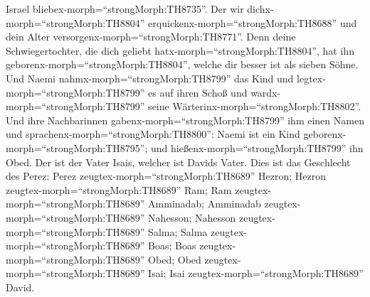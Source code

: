 Israel bliebex-morph=``strongMorph:TH8735''.  Der wir
dichx-morph=``strongMorph:TH8804''
erquickenx-morph=``strongMorph:TH8688'' und dein Alter
versorgenx-morph=``strongMorph:TH8771''. Denn deine Schwiegertochter,
die dich geliebt hatx-morph=``strongMorph:TH8804'', hat ihn
geborenx-morph=``strongMorph:TH8804'', welche dir besser ist als sieben
Söhne.  Und Naemi nahmx-morph=``strongMorph:TH8799'' das
Kind und legtex-morph=``strongMorph:TH8799'' es auf ihren Schoß und
wardx-morph=``strongMorph:TH8799'' seine
Wärterinx-morph=``strongMorph:TH8802''.  Und ihre
Nachbarinnen gabenx-morph=``strongMorph:TH8799'' ihm einen Namen und
sprachenx-morph=``strongMorph:TH8800'': Naemi ist ein Kind
geborenx-morph=``strongMorph:TH8795''; und
hießenx-morph=``strongMorph:TH8799'' ihn Obed. Der ist der Vater Isais,
welcher ist Davids Vater.  Dies ist das Geschlecht des
Perez: Perez zeugtex-morph=``strongMorph:TH8689'' Hezron; 
Hezron zeugtex-morph=``strongMorph:TH8689'' Ram; Ram
zeugtex-morph=``strongMorph:TH8689'' Amminadab;  Amminadab
zeugtex-morph=``strongMorph:TH8689'' Nahesson; Nahesson
zeugtex-morph=``strongMorph:TH8689'' Salma;  Salma
zeugtex-morph=``strongMorph:TH8689'' Boas; Boas
zeugtex-morph=``strongMorph:TH8689'' Obed;  Obed
zeugtex-morph=``strongMorph:TH8689'' Isai; Isai
zeugtex-morph=``strongMorph:TH8689'' David.
